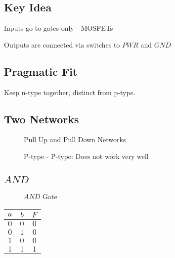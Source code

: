 \documentclass[a4paper,12pt]{article}
\begin{document}
\subsection*{Key Idea}

Inputs go to gates only - MOSFETs

Outputs are connected via switches to $PWR$ and $GND$

\subsection*{Pragmatic Fit}

Keep n-type together, distinct from p-type.


\subsection*{Two Networks}

\begin{figure}[hbtp]


\caption{Pull Up and Pull Down Networks}

\end{figure}

\begin{figure}[hbtp]


\caption{P-type - P-type: Does not work very well}

\end{figure}

\subsection*{$AND$}

\begin{figure}[hbt] 
\centering 



\caption{$AND$ Gate}

\label{AND Gate} 

\end{figure} 


\begin{tabular}{cc|c}
$a$	&	$b$	&	$F$	\\
\hline
$0$	&	$0$	&	$0$	\\
$0$	&	$1$	&	$0$	\\
$1$	&	$0$	&	$0$	\\
$1$	&	$1$	&	$1$	
\end{tabular}
\end{document}

